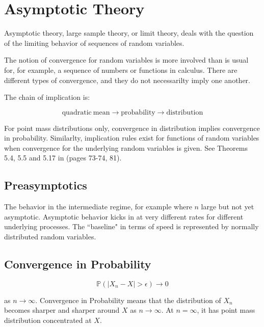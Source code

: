 \section{Asymptotic Theory}

Asymptotic theory, large sample theory, or limit theory, deals with the question of the limiting behavior of sequences of random variables. 

The notion of convergence for random variables is more involved than is usual for, for example, a sequence of numbers or functions in calculus. There are different types of convergence, and they do not necessarilty imply one another.

The chain of implication is:

\begin{equation}
\mathrm{quadratic\ mean} \rightarrow \mathrm{probability} \rightarrow \mathrm{distribution}
\end{equation}

For point mass distributions only, convergence in distribution implies convergence in probability. Similarlty, implication rules exist for functions of random variables when convergence for the underlying random variables is given. See Theorems 5.4, 5.5 and 5.17 in  (pages 73-74, 81). 

\subsection{Preasymptotics}
The behavior in the intermediate regime, for example where $n$ large but not yet asymptotic. Asymptotic behavior kicks in at very different rates for different underlying processes. The ``baseline" in terms of speed is represented by normally distributed random variables.


\subsection{Convergence in Probability}

\begin{equation}
\mathbb{P}(|X_n - X| > \epsilon) \rightarrow 0
\end{equation}

as $n\rightarrow \infty$. Convergence in Probability means that the distribution of $X_n$ becomes sharper and sharper around $X$ as $n\rightarrow \infty$. At $n=\infty$, it has point mass distribution concentrated at $X$.


